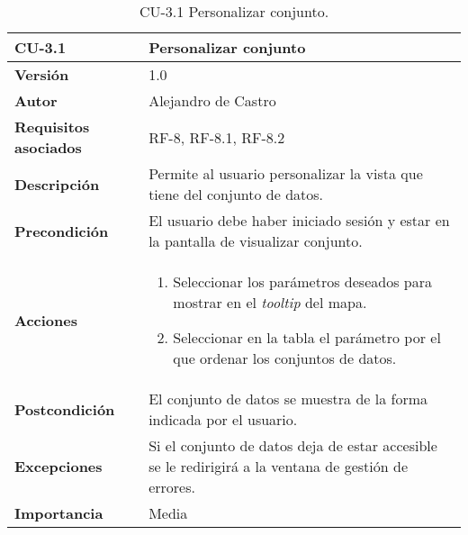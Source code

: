 \begin{table}[p]
	\centering
	\begin{tabularx}{\linewidth}{ p{} p{} }
		\toprule
		\textbf{CU-3.1}    & \textbf{Personalizar conjunto}\\
		\toprule
		\textbf{Versión}              & 1.0    \\
		\textbf{Autor}                & {Alejandro de Castro} \\
		\textbf{Requisitos asociados} & RF-8, RF-8.1, RF-8.2 \\
		\textbf{Descripción}          & Permite al usuario personalizar la vista que tiene del conjunto de datos. \\
		\textbf{Precondición}         & El usuario debe haber iniciado sesión y estar en la pantalla de visualizar conjunto. \\
		\textbf{Acciones}             &
		\begin{enumerate}
			\def\labelenumi{\arabic{enumi}.}
			\tightlist
			\item Seleccionar los parámetros deseados para mostrar en el \textit{tooltip} del mapa.
			\item Seleccionar en la tabla el parámetro por el que ordenar los conjuntos de datos.
		\end{enumerate}\\
		\textbf{Postcondición}        & El conjunto de datos se muestra de la forma indicada por el usuario. \\
		\textbf{Excepciones}          & Si el conjunto de datos deja de estar accesible se le redirigirá a la ventana de gestión de errores. \\
		\textbf{Importancia}          & Media \\
		\bottomrule
	\end{tabularx}
	\caption{CU-3.1 Personalizar conjunto.}
\end{table}


